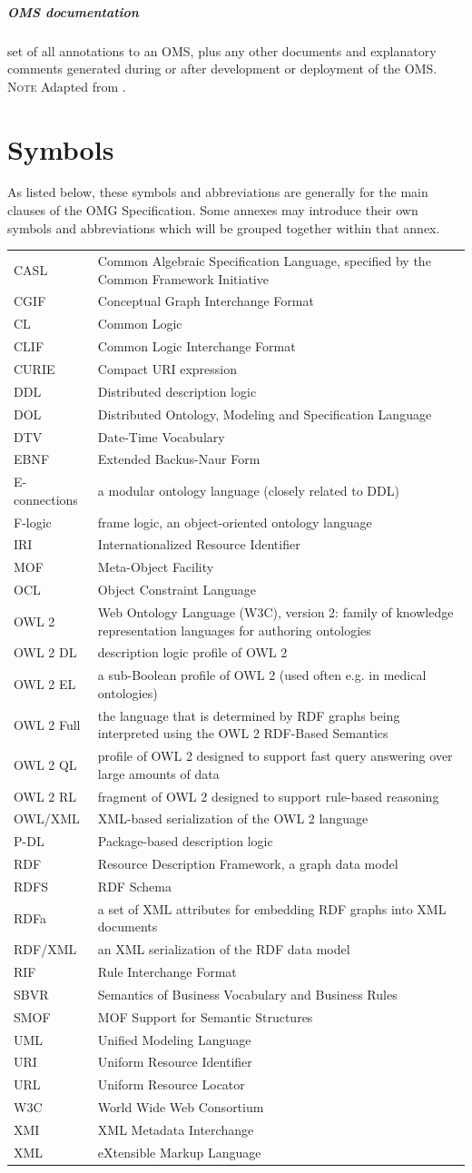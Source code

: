\documentclass[10pt,fleqn,final]{scrreprt}
\makeatletter
\newcommand*{\eg}{e.g.\@\xspace}
\newcommand*{\termref}[1]{\index{#1}#1\xspace}
\newcommand*{\IS}{OMG Specification\xspace}
\newenvironment{symbols}[0]{\begin{longtable}{p{.15\textwidth}p{.84\textwidth}}}{\end{longtable}}
\newcommand{\symboldef}[2]{ #1 & #2 \\}
\newcommand{\clause}[1]{\chapter{#1}}
\newcommand{\termdefinition}[2]{\index{#1}\paragraph{#1} #2}
\newenvironment{definitions}[0]{\medskip }{}
\newenvironment{note}[0]{\ \\ \textsc{Note} \quad}{}
\makeatother
\begin{document}
\begin{definitions}
\begin{definitions}
  \termdefinition{OMS documentation}{set of all annotations\index{annotation} to an \termref{OMS}, plus any other documents and explanatory comments generated during or after development or deployment of the OMS.}
  \begin{note}
    Adapted from \cite{SuarezFigueroaEtAl:OntologyGlossary2008}.
  \end{note}
\end{definitions}


\clause{Symbols}

As listed below, these symbols and abbreviations are generally for the main clauses of the \IS. Some annexes may introduce their own symbols and abbreviations which will be grouped together within that annex.

\begin{symbols}
\symboldef{CASL}{Common Algebraic Specification Language, specified by the Common Framework Initiative}
\symboldef{CGIF}{Conceptual Graph Interchange Format}
\symboldef{CL}{Common Logic }
\symboldef{CLIF}{Common Logic Interchange Format}
\symboldef{CURIE}{Compact URI expression}
\symboldef{DDL}{Distributed description logic \cite{borgida6}}
\symboldef{DOL}{Distributed Ontology, Modeling and Specification Language}
\symboldef{DTV}{Date-Time Vocabulary}
\symboldef{EBNF}{Extended Backus-Naur Form}
\symboldef{E-connections}{a modular ontology language (closely related to DDL) \cite{Kutzetal04}} 
\symboldef{F-logic}{frame logic, an object-oriented ontology language}
\symboldef{IRI}{Internationalized Resource Identifier}
\symboldef{MOF}{Meta-Object Facility}
\symboldef{OCL}{Object Constraint Language}
\symboldef{OWL 2}{Web Ontology Language (W3C), version 2: family of knowledge representation languages for authoring ontologies}
\symboldef{OWL 2 DL}{description logic profile of OWL 2}
\symboldef{OWL 2 EL}{a sub-Boolean profile of OWL 2 (used often \eg in medical ontologies)}
\symboldef{OWL 2 Full}{the language that is determined by RDF graphs being interpreted 
using the OWL 2 RDF-Based Semantics \cite{W3C:REC-owl2-rdf-based-semantics-20091027}}
\symboldef{OWL 2 QL}{profile of OWL 2 designed to support fast query answering over large amounts of data}
\symboldef{OWL 2 RL}{fragment of OWL 2 designed to support rule-based reasoning}
\symboldef{OWL/XML}{XML-based serialization of the OWL 2 language}
\symboldef{P-DL}{Package-based description logic}
\symboldef{RDF}{Resource Description Framework, a graph data model}
\symboldef{RDFS}{RDF Schema}
\symboldef{RDFa}{a set of XML attributes for embedding RDF graphs into XML documents}
\symboldef{RDF/XML}{an XML serialization of the RDF data model}
\symboldef{RIF}{Rule Interchange Format}
\symboldef{SBVR}{Semantics of Business Vocabulary and Business Rules}
\symboldef{SMOF}{MOF Support for Semantic Structures}
\symboldef{UML}{Unified Modeling Language}
\symboldef{URI}{Uniform Resource Identifier}
\symboldef{URL}{Uniform Resource Locator}
\symboldef{W3C}{World Wide Web Consortium}
\symboldef{XMI}{XML Metadata Interchange}
\symboldef{XML}{eXtensible Markup Language}
\end{symbols}



\end{definitions}
\end{document}
